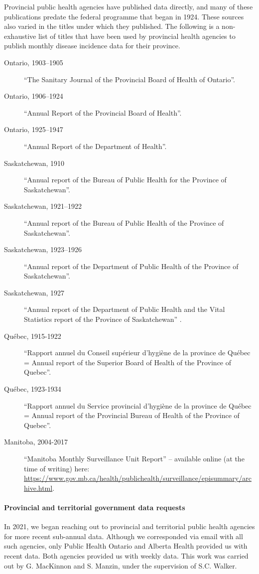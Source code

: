 \documentclass[12pt]{article}
\begin{document}
Provincial public health agencies have published data directly, and many of these publications predate the federal programme that began in 1924. These sources also varied in the titles under which they published. The following is a non-exhaustive list of titles that have been used by provincial health agencies to publish monthly disease incidence data for their province.
\begin{description}
  \item[Ontario, 1903--1905] ``The Sanitary Journal of the Provincial Board of Health of Ontario''.
  \item[Ontario, 1906--1924] ``Annual Report of the Provincial Board of Health''.
  \item[Ontario, 1925--1947] ``Annual Report of the Department of Health''.
  \item[Saskatchewan, 1910] ``Annual report of the Bureau of Public Health for the Province of Saskatchewan''.
  \item[Saskatchewan, 1921--1922] ``Annual report of the Bureau of Public Health of the Province of Saskatchewan''.
  \item[Saskatchewan, 1923--1926] ``Annual report of the Department of Public Health of the Province of Saskatchewan''.
  \item[Saskatchewan, 1927] ``Annual report of the Department of Public Health and the Vital Statistics report of the Province of Saskatchewan'' .
  \item[Québec, 1915-1922] ``Rapport annuel du Conseil supérieur d'hygiène de la province de Québec = Annual report of the Superior Board of Health of the Province of Quebec''.
  \item[Québec, 1923-1934] ``Rapport annuel du Service provincial d'hygiène de la province de Québec = Annual report of the Provincial Bureau of Health of the Province of Quebec''.
  \item[Manitoba, 2004-2017] ``Manitoba Monthly Surveillance Unit Report'' -- available online (at the time of writing) here: \url{https://www.gov.mb.ca/health/publichealth/surveillance/episummary/archive.html}. 
\end{description}

\paragraph*{Provincial and territorial government data requests}

In 2021, we began reaching out to provincial and territorial public health agencies for more recent sub-annual data. Although we corresponded via email with all such agencies, only Public Health Ontario and Alberta Health provided us with recent data. Both agencies provided us with weekly data. This work was carried out by G. MacKinnon and S. Manzin, under the supervision of S.C. Walker.
\end{document}
